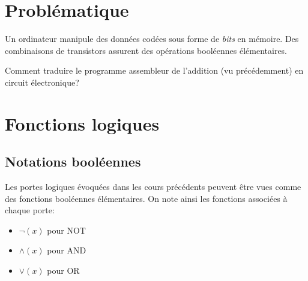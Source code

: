 \documentclass[a4paper,11pt]{article}
\begin{document}
\begin{Form}
\section{Problématique}
Un ordinateur manipule des données codées sous forme de \emph{bits} en mémoire. Des combinaisons de transistors assurent des opérations booléennes élémentaires.
\begin{center}
\end{center}
\begin{commentprof}
Comment traduire le programme assembleur de l'addition (vu précédemment) en circuit électronique?
\end{commentprof}
\section{Fonctions logiques}
\subsection{Notations booléennes}
Les portes logiques évoquées dans les cours précédents peuvent être vues comme des fonctions booléennes élémentaires. On note ainsi les fonctions associées à chaque porte:
\begin{itemize}
\item $\lnot(x)$ pour NOT
\item $\land(x)$ pour AND
\item $\lor(x)$ pour OR
\end{itemize}

\end{Form}
\end{document}
